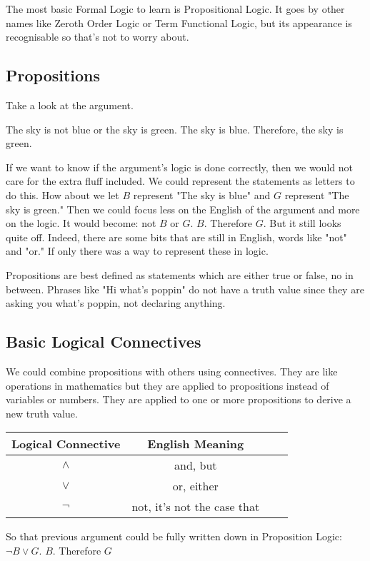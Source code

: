 \documentclass[12pt,letterpaper]{article}
\begin{document}
The most basic Formal Logic to learn is Propositional Logic.  It goes by other names like Zeroth Order Logic or Term Functional Logic, but its appearance is recognisable so that's not to worry about.

\subsection{Propositions}
Take a look at the argument.

The sky is not blue or the sky is green.
The sky is blue.
Therefore, the sky is green.

If we want to know if the argument's logic is done correctly, then we would not care for the extra fluff included.  We could represent the statements as letters to do this.  How about we let $B$ represent "The sky is blue" and $G$ represent "The sky is green."  Then we could focus less on the English of the argument and more on the logic.  It would become: not $B$ or $G$. $B$.  Therefore $G$.  But it still looks quite off.  Indeed, there are some bits that are still in English, words like "not" and "or."  If only there was a way to represent these in logic.

Propositions are best defined as statements which are either true or false, no in between.  Phrases like "Hi what's poppin" do not have a truth value since they are asking you what's poppin, not declaring anything.

\subsection{Basic Logical Connectives}
We could combine propositions with others using connectives.  They are like operations in mathematics but they are applied to propositions instead of variables or numbers.  They are applied to one or more propositions to derive a new truth value.

\begin{center}
\begin{tabular}{c c c c} 
 \hline
 Logical Connective & English Meaning \\ [0.5ex] 
 \hline\hline
 $\land$ & and, but \\ 
 $\lor$ & or, either \\
 $\neg$ & not, it's not the case that \\  
\end{tabular}
\end{center}

So that previous argument could be fully written down in Proposition Logic:  $\neg B \lor G$. $B$.  Therefore $G$
\end{document}
